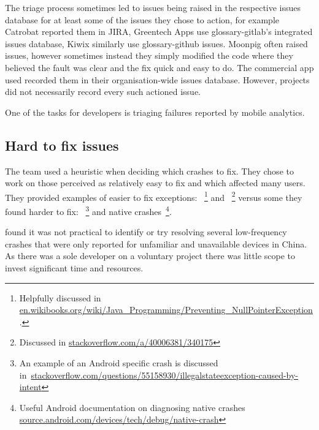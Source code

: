 The triage process sometimes led to issues being raised in the respective issues database for at least some of the issues they chose to action, for example Catrobat reported them in JIRA, Greentech Apps use \Gls{glossary-gitlab}'s integrated issues database, Kiwix similarly use \gls{glossary-github} issues. Moonpig often raised issues, however sometimes instead they simply modified the code where they believed the fault was clear and the fix quick and easy to do. The commercial app used recorded them in their organisation-wide issues database. However, projects did not necessarily record every such actioned issue. 

One of the tasks for developers is triaging failures reported by mobile analytics. 

\subsection{Hard to fix issues}
The  team used a heuristic when deciding which crashes to fix. They chose to work on those perceived as relatively easy to fix and which affected many users. They provided examples of easier to fix exceptions: ~\footnote{Helpfully discussed in \href{https://en.wikibooks.org/wiki/Java\_Programming/Preventing\_NullPointerException}{en.wikibooks.org/wiki/Java\_Programming/Preventing\_NullPointerException}.} and ~\footnote{Discussed in \href{https://stackoverflow.com/a/40006381/340175}{stackoverflow.com/a/40006381/340175}} versus some they found harder to fix: ~\footnote{An example of an Android specific crash is discussed in~\href{https://stackoverflow.com/questions/55158930/illegalstateexception-caused-by-intent}{stackoverflow.com/questions/55158930/illegalstateexception-caused-by-intent}} and native crashes~\footnote{Useful Android documentation on diagnosing native crashes \href{https://source.android.com/devices/tech/debug/native-crash}{source.android.com/devices/tech/debug/native-crash}}.

 found it was not practical to identify or try resolving several low-frequency crashes that were only reported for unfamiliar and unavailable devices in China. As there was a sole developer on a voluntary project there was little scope to invest significant time and resources.

